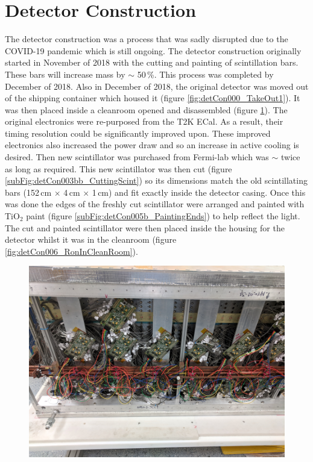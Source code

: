 \section{Detector Construction}\label{sec:DetectorConstruction}
The detector construction was a process that was sadly disrupted due to the COVID-19 pandemic which is still ongoing. The detector construction originally started in November of 2018 with the cutting and painting of scintillation bars. These bars will increase mass by $\sim$ 50\,\%. This process was completed by December of 2018. Also in December of 2018, the original detector was moved out of the shipping container which housed it (figure \ref{fig:detCon000_TakeOut1}). It was then placed inside a cleanroom opened and disassembled (figure \ref{fig:detCon002_OldTearAway}). The original electronics were re-purposed from the T2K ECal. As a result, their timing resolution could be significantly improved upon. These improved electronics also increased the power draw and so an increase in active cooling is desired. Then new scintillator was purchased from Fermi-lab which was $\sim$ twice as long as required. This new scintillator was then cut (figure \ref{subFig:detCon003bb_CuttingScint}) so its dimensions match the old scintillating bars (152\,cm $\times$ 4\,cm $\times$ 1\,cm) and fit exactly inside the detector casing. Once this was done the edges of the freshly cut scintillator were arranged and painted with TiO$_2$ paint (figure \ref{subFig:detCon005b_PaintingEnds}) to help reflect the light. The cut and painted scintillator were then placed inside the housing for the detector  whilst it was in the cleanroom (figure \ref{fig:detCon006_RonInCleanRoom}).

\begin{figure}[htbp]
\centering
\includegraphics[width=0.8\linewidth]{Chapter3/Figs/Raster/detCon002_OldTearAway.png}
\label{fig:detCon002_OldTearAway}
\end{figure}


